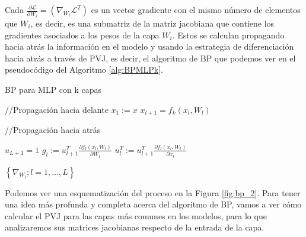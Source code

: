 Cada $\frac{\partial \mathcal{L}}{\partial W_i}= \left ( \nabla_{W_i} \mathcal{L}^T \right )$ es un vector gradiente con el mismo número de elementos que $W_i$, es decir, es una submatriz de la matriz jacobiana que contiene los gradientes asociados a los pesos de la capa $W_i$. Estos se calculan propagando hacia atrás la información en el modelo y usando la estrategia de diferenciación hacia atrás a través de PVJ, es decir, el algoritmo de BP que podemos ver en el pseudocódigo del Algoritmo \ref{alg:BPMLPk}. 



\begin{algorithm}
\caption{BP para MLP con k capas}
\label{alg:BPMLPk}
    \begin{algorithmic}
        \State //Propagación hacia delante
        \State $x_1:=x$
            \State $x_{l+1}=f_k(x_l, W_l)$
        \EndFor

        \State //Propagación hacia atrás

        \State $u_{L+1}=1$
            \State $g_l:= u_{l+1}^T \frac{\partial f_l(x_l, W_l)}{\partial W_l}$
            \State $u_l^T:=u_{l+1}^T\frac{\partial f_l(x_l, W_l)}{\partial x_l}$
        \EndFor
            

        \Return $\left \{  \nabla_{W_l}; l=1,\ldots,L \right \}$
    \end{algorithmic}
\end{algorithm}


Podemos ver una esquematización del proceso en la Figura \ref{fig:bp_2}. Para tener una idea más profunda y completa acerca del algoritmo de BP, vamos a ver cómo calcular el PVJ para las capas más comunes en los modelos, para lo que analizaremos sus matrices jacobianas respecto de la entrada de la capa. 


